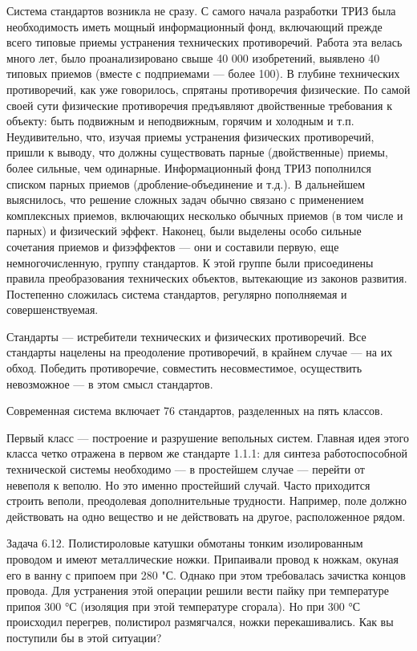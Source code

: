 Система стандартов возникла не сразу.  С самого начала разработки ТРИЗ
была необходимость иметь мощный информационный фонд, включающий прежде
всего типовые  приемы устранения технических противоречий.  Работа эта
велась  много лет,  было  проанализировано свыше  40 000  изобретений,
выявлено  40  типовых приемов  (вместе  с  подприемами —  более  100).
В  глубине  технических  противоречий, как  уже  говорилось,  спрятаны
противоречия физические.  По самой своей сути  физические противоречия
предъявляют  двойственные  требования  к  объекту:  быть  подвижным  и
неподвижным,  горячим и  холодным  и т.п.  Неудивительно, что,  изучая
приемы  устранения  физических  противоречий,  пришли  к  выводу,  что
должны существовать  парные (двойственные) приемы, более  сильные, чем
одинарные. Информационный фонд ТРИЗ  пополнился списком парных приемов
(дробление-объединение и  т.д.). В дальнейшем выяснилось,  что решение
сложных  задач  обычно  связано  с  применением  комплексных  приемов,
включающих  несколько  обычных  приемов  (в  том  числе  и  парных)  и
физический  эффект. Наконец,  были  выделены  особо сильные  сочетания
приемов и физэффектов — они  и составили первую, еще немногочисленную,
группу   стандартов.  К   этой   группе   были  присоединены   правила
преобразования технических  объектов, вытекающие из  законов развития.
Постепенно  сложилась  система  стандартов,  регулярно  пополняемая  и
совершенствуемая.

Стандарты  — истребители  технических и  физических противоречий.  Все
стандарты нацелены на преодоление противоречий,  в крайнем случае — на
их обход. Победить противоречие, совместить несовместимое, осуществить
невозможное — в этом смысл стандартов.


Современная  система  включает  76  стандартов,  разделенных  на  пять
классов.

Первый класс — построение и  разрушение вепольных систем. Главная идея
этого класса четко  отражена в первом же стандарте  1.1.1: для синтеза
работоспособной технической системы необходимо — в простейшем случае —
перейти  от  невеполя  к  веполю. Но  это  именно  простейший  случай.
Часто приходится строить веполи, преодолевая дополнительные трудности.
Например, поле должно действовать на одно вещество и не действовать на
другое, расположенное рядом.

Задача  6.12.  Полистироловые  катушки обмотаны  тонким  изолированным
проводом  и имеют  металлические  ножки. Припаивали  провод к  ножкам,
окуная его в  ванну с припоем при 280 "С.  Однако при этом требовалась
зачистка  концов провода.  Для устранения  этой операции  решили вести
пайку при  температуре припоя  300 °С  (изоляция при  этой температуре
сгорала). Но  при 300 °С происходил  перегрев, полистирол размягчался,
ножки перекашивались. Как вы поступили бы в этой ситуации?

